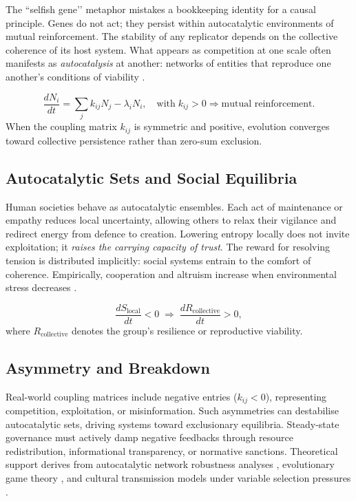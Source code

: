 \documentclass[12pt,a4paper]{article}
\begin{document}
The ``selfish gene’’ metaphor mistakes a bookkeeping identity for a causal principle.
Genes do not act; they persist within autocatalytic environments of mutual reinforcement.
The stability of any replicator depends on the
collective coherence of its host system.
What appears as competition at one scale often
manifests as \emph{autocatalysis} at another:
networks of entities that reproduce one another’s conditions of viability
\citep{capra2021systems,morin2008method}.

\[
\frac{dN_i}{dt} = 
\sum_j k_{ij} N_j - \lambda_i N_i,
\quad
\text{with}\;
k_{ij} > 0
\Rightarrow
\text{mutual reinforcement.}
\]
When the coupling matrix $k_{ij}$ is symmetric and positive, evolution converges
toward collective persistence rather than zero-sum exclusion.

\subsection{Autocatalytic Sets and Social Equilibria}

Human societies behave as autocatalytic ensembles.
Each act of maintenance or empathy reduces local uncertainty,
allowing others to relax their vigilance and redirect energy from defence to creation.
Lowering entropy locally does not invite exploitation; it 
\emph{raises the carrying capacity of trust}.
The reward for resolving tension is distributed implicitly:
social systems entrain to the comfort of coherence.
Empirically, cooperation and altruism increase
when environmental stress decreases
\citep{bernhard2021cooperation}.

\[
\frac{dS_{\text{local}}}{dt} < 0
\;\Rightarrow\;
\frac{dR_{\text{collective}}}{dt} > 0,
\]
where $R_{\text{collective}}$ denotes the group’s resilience or reproductive viability.

\subsection{Asymmetry and Breakdown}

Real-world coupling matrices include negative entries ($k_{ij} < 0$), 
representing competition, exploitation, or misinformation. 
Such asymmetries can destabilise autocatalytic sets, 
driving systems toward exclusionary equilibria. 
Steady-state governance must actively damp negative feedbacks 
through resource redistribution, informational transparency, 
or normative sanctions. Theoretical support derives from 
autocatalytic network robustness analyses \citep{kauffman1993origins}, 
evolutionary game theory \citep{nowak2006five}, 
and cultural transmission models under variable selection pressures 
\citep{henrich2016cooperation}.
\end{document}
